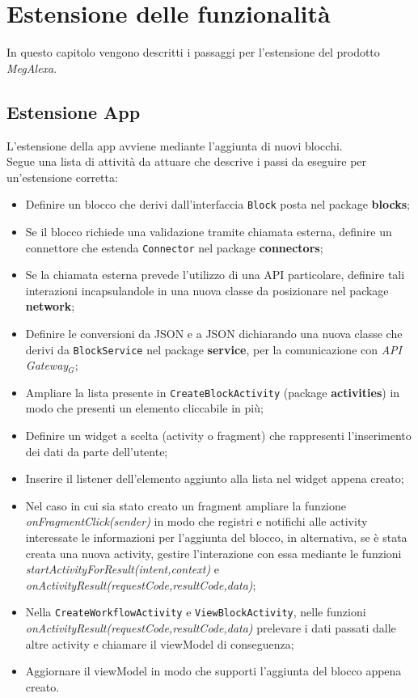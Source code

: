 \chapter{Estensione delle funzionalità}\label{estensione}
In questo capitolo vengono descritti i passaggi per l'estensione del prodotto \textit{MegAlexa}.

\section{Estensione App}
L'estensione della app avviene mediante l'aggiunta di nuovi blocchi.\\
Segue una lista di attività da attuare che descrive i passi da eseguire per un'estensione corretta:

\begin{itemize}
	\item Definire un blocco che derivi dall'interfaccia \texttt{Block} posta nel package \textbf{blocks};
	\item Se il blocco richiede una validazione tramite chiamata esterna, definire un connettore che estenda \texttt{Connector} nel package \textbf{connectors};
	\item Se la chiamata esterna prevede l'utilizzo di una API particolare, definire tali interazioni incapsulandole in una nuova classe da posizionare nel package \textbf{network};
	\item Definire le conversioni da JSON e a JSON dichiarando una nuova classe che derivi da \texttt{BlockService} nel package \textbf{service}, per la comunicazione con \textit{API Gateway$_{G}$};
	\item Ampliare la lista presente in \texttt{CreateBlockActivity} (package \textbf{activities}) in modo che presenti un elemento cliccabile in più;
	\item Definire un widget a scelta (activity o fragment) che rappresenti l'inserimento dei dati da parte dell'utente;
	\item Inserire il listener dell'elemento aggiunto alla lista nel widget appena creato;
	\item Nel caso in cui sia stato creato un fragment ampliare la funzione \textit{onFragmentClick(sender)} in modo che registri e notifichi alle activity interessate le informazioni per l'aggiunta del blocco, in alternativa, se è stata creata una nuova activity, gestire l'interazione con essa mediante le funzioni \textit{startActivityForResult(intent,context)} e \textit{onActivityResult(requestCode,resultCode,data)};
	\item Nella \texttt{CreateWorkflowActivity} e \texttt{ViewBlockActivity}, nelle funzioni \textit{onActivityResult(requestCode,resultCode,data)} 	prelevare i dati passati dalle altre activity e chiamare il viewModel di conseguenza;
	\item Aggiornare il viewModel in modo che supporti l'aggiunta del blocco appena creato.
\end{itemize}



